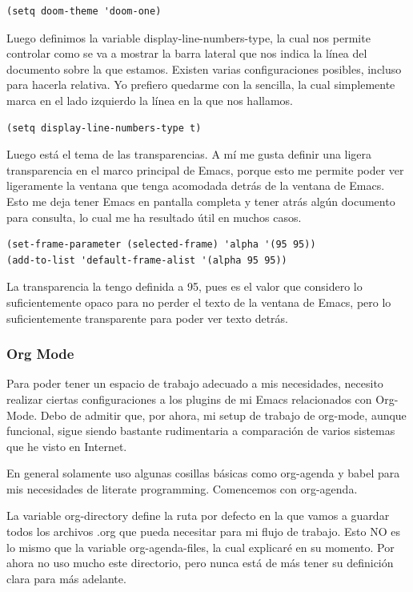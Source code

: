 \documentclass[11pt]{article}
\begin{document}
\begin{verbatim}
(setq doom-theme 'doom-one)
\end{verbatim}

Luego definimos la variable display-line-numbers-type, la cual nos permite controlar como se va a mostrar la barra lateral que nos indica la línea del documento sobre la que estamos. Existen varias configuraciones posibles, incluso para hacerla relativa. Yo prefiero quedarme con la sencilla, la cual simplemente marca en el lado izquierdo la línea en la que nos hallamos.

\begin{verbatim}
(setq display-line-numbers-type t)
\end{verbatim}

Luego está el tema de las transparencias. A mí me gusta definir una ligera transparencia en el marco principal de Emacs, porque esto me permite poder ver ligeramente la ventana que tenga acomodada detrás de la ventana de Emacs. Esto me deja tener Emacs en pantalla completa y tener atrás algún documento para consulta, lo cual me ha resultado útil en muchos casos.

\begin{verbatim}
(set-frame-parameter (selected-frame) 'alpha '(95 95))
(add-to-list 'default-frame-alist '(alpha 95 95))
\end{verbatim}

La transparencia la tengo definida a 95, pues es el valor que considero lo suficientemente opaco para no perder el texto de la ventana de Emacs, pero lo suficientemente transparente para poder ver texto detrás.
\subsubsection{Org Mode}
\label{sec:orge1d4f69}

Para poder tener un espacio de trabajo adecuado a mis necesidades, necesito realizar ciertas configuraciones a los plugins de mi Emacs relacionados con Org-Mode. Debo de admitir que, por ahora, mi setup de trabajo de org-mode, aunque funcional, sigue siendo bastante rudimentaria a comparación de varios sistemas que he visto en Internet.

En general solamente uso algunas cosillas básicas como org-agenda y babel para mis necesidades de literate programming. Comencemos con org-agenda.

La variable org-directory define la ruta por defecto en la que vamos a guardar todos los archivos .org que pueda necesitar para mi flujo de trabajo. Esto NO es lo mismo que la variable org-agenda-files, la cual explicaré en su momento. Por ahora no uso mucho este directorio, pero nunca está de más tener su definición clara para más adelante.
\end{document}
